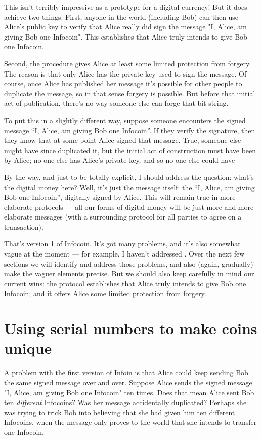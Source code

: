 \documentclass[12pt]{book}
\newcounter{problem}[chapter]
\newcounter{example}[chapter]
\begin{document}
This isn't terribly impressive as a prototype for a digital currency!
But it does achieve two things.  First, anyone in the world (including
Bob) can then use Alice's public key to verify that Alice really did
sign the message "I, Alice, am giving Bob one Infocoin".  This
establishes that Alice truly intends to give Bob one Infocoin.

Second, the procedure gives Alice at least some limited protection
from forgery.  The reason is that only Alice has the private key used
to sign the message.  Of course, once Alice has published her message
it's possible for other people to duplicate the message, so in that
sense forgery is possible.  But before that initial act of
publication, there's no way someone else can forge that bit string.

To put this in a slightly different way, suppose someone encounters
the signed message ``I, Alice, am giving Bob one Infocoin''.  If they
verify the signature, then they know that at some point Alice signed
that message.  True, someone else might have since duplicated it, but
the initial act of construction must have been by Alice; no-one else
has Alice's private key, and so no-one else could have 

By the way, and just to be totally explicit, I should address the
question: what's the digital money here?  Well, it's just the message
itself: the ``I, Alice, am giving Bob one Infocoin'', digitally signed
by Alice.  This will remain true in more elaborate protocols --- all
our forms of digital money will be just more and more elaborate
messages (with a surrounding protocol for all parties to agree on a
transaction).

That's version 1 of Infocoin.  It's got many problems, and it's also
somewhat vague at the moment --- for example, I haven't addressed .
Over the next few sections we will identify and address those
problems, and also (again, gradually) make the vaguer elements
precise.  But we should also keep carefully in mind our current wins:
the protocol establishes that Alice truly intends to give Bob one
Infocoin; and it offers Alice some limited protection from forgery.

\section{Using serial numbers to make coins unique}

A problem with the first version of Infoin is that Alice could keep
sending Bob the same signed message over and over.  Suppose Alice
sends the signed message "I, Alice, am giving Bob one Infocoin" ten
times.  Does that mean Alice sent Bob ten \emph{different} Infocoins?
Was her message accidentally duplicated?  Perhaps she was trying to
trick Bob into believing that she had given him ten different
Infocoins, when the message only proves to the world that she intends
to transfer one Infocoin.
\end{document}
